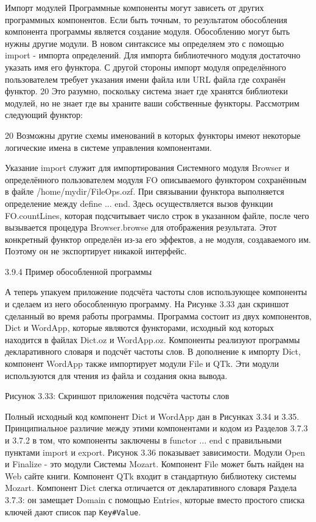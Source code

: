 Импорт модулей Программные компоненты могут зависеть от других программных компонентов. Если быть точным, то результатом обособления компонента программы является создание модуля. Обособлению могут быть нужны другие модули. В новом синтаксисе мы определяем это с помощью import - импорта определений. Для импорта библиотечного модуля достаточно указать имя его функтора. С другой стороны импорт модуля определённого пользователем требует указания имени файла или URL файла где сохранён функтор. 20 Это разумно, поскольку система знает где хранятся библиотеки модулей, но не знает где вы храните ваши собственные функторы. Рассмотрим следующий функтор:

20 Возможны другие схемы именований в которых функторы имеют некоторые логические имена в системе управления компонентами.

Указание import служит для импортирования Системного модуля Browser и определённого пользователем модуля FO описываемого функтором сохранённым в файле /home/mydir/FileOps.ozf. При связывании функтора выполняется определение между define ... end. Здесь осуществляется вызов функции FO.countLines, которая подсчитывает число строк в указанном файле, после чего вызывается процедура Browser.browse для отображения результата. Этот конкретный функтор определён из-за его эффектов, а не модуля, создаваемого им. Поэтому он не экспортирует никакой интерфейс.

3.9.4 Пример обособленной программы

А теперь упакуем приложение подсчёта частоты слов использующее компоненты и сделаем из него обособленную программу. На Рисунке 3.33 дан скриншот сделанный во время работы программы. Программа состоит из двух компонентов, Dict и WordApp, которые являются функторами, исходный код которых находится в файлах Dict.oz и WordApp.oz. Компоненты реализуют программы декларативного словаря и подсчёт частоты слов. В дополнение к импорту Dict, компонент WordApp также импортирует модули File и QTk. Эти модули используются для чтения из файла и создания окна вывода.

Рисунок 3.33: Скриншот приложения подсчёта частоты слов

Полный исходный код компонент Dict и WordApp дан в Рисунках 3.34 и 3.35. Принципиальное различие между этими компонентами и кодом из Разделов 3.7.3 и 3.7.2 в том, что компоненты заключены в functor ... end с правильными пунктами import и export. Рисунок 3.36 показывает зависимости. Модули Open и Finalize - это модули Системы Mozart. Компонент File может быть найден на Web сайте книги. Компонент QTk входит в стандартную библиотеку системы Mozart. Компонент Dict слегка отличается от декларативного словаря Раздела 3.7.3: он замещает Domain с помощью Entries, которые вместо простого списка ключей дают список пар \verb!Key#Value!.

